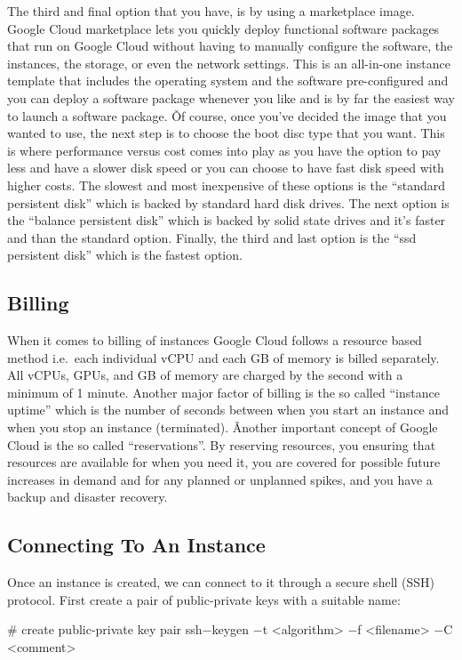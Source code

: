 The third and final option that you have, is by using a marketplace image. Google Cloud marketplace lets you quickly
deploy functional software packages that run on Google Cloud without having to manually configure the software, the
instances, the storage, or even the network settings. This is an all-in-one instance template that includes the
operating system and the software pre-configured and you can deploy a software package whenever you like and is by
far the easiest way to launch a software package. \v

Of course, once you've decided the image that you wanted to use, the next step is to choose the boot disc type that
you want. This is where performance versus cost comes into play as you have the option to pay less and have a slower
disk speed or you can choose to have fast disk speed with higher costs. The slowest and most inexpensive of these
options is the ``standard persistent disk'' which is backed by standard hard disk drives. The next option is the
``balance persistent disk'' which is backed by solid state drives and it's faster and than the standard option.
Finally, the third and last option is the ``ssd persistent disk'' which is the fastest option.

\subsection{Billing}

When it comes to billing of instances Google Cloud follows a resource based method i.e.\ each individual vCPU and
each GB of memory is billed separately. All vCPUs, GPUs, and GB of memory are charged by the second with a minimum of
1 minute. Another major factor of billing is the so called ``instance uptime'' which is the number of seconds between
when you start an instance and when you stop an instance (terminated). \v

Another important concept of Google Cloud is the so called ``reservations''. By reserving resources, you ensuring
that resources are available for when you need it, you are covered for possible future increases in demand and for any
planned or unplanned spikes, and you have a backup and disaster recovery.

\subsection{Connecting To An Instance}

Once an instance is created, we can connect to it through a secure shell (SSH) protocol. First create a pair of
public-private keys with a suitable name:
\begin{bash}
# create public-private key pair
ssh$-$keygen $-$t <algorithm> $-$f <filename> $-$C <comment>
\end{bash}

